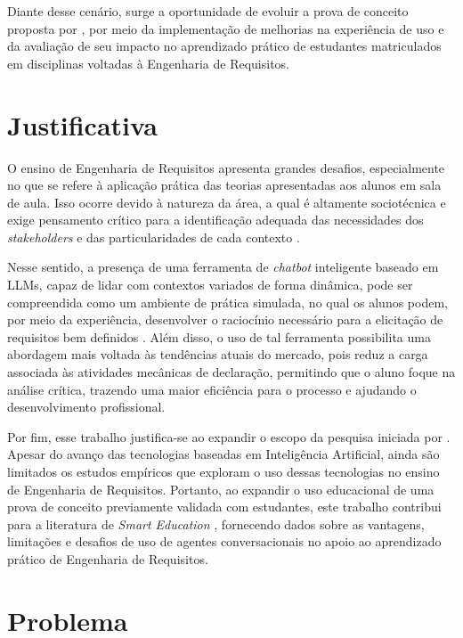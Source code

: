 Diante desse cenário, surge a oportunidade de evoluir a prova de conceito proposta por , por meio da implementação de melhorias na experiência de uso e da avaliação de seu impacto no aprendizado prático de estudantes matriculados em disciplinas voltadas à Engenharia de Requisitos.

\section{Justificativa}

O ensino de Engenharia de Requisitos apresenta grandes desafios, especialmente no que se refere à aplicação prática das teorias apresentadas aos alunos em sala de aula. Isso ocorre devido à natureza da área, a qual é altamente sociotécnica e exige pensamento crítico para a identificação adequada das necessidades dos \textit{stakeholders} e das particularidades de cada contexto \cite{sommerville2016}.

Nesse sentido, a presença de uma ferramenta de \textit{chatbot} inteligente baseado em LLMs, capaz de lidar com contextos variados de forma dinâmica, pode ser compreendida como um ambiente de prática simulada, no qual os alunos podem, por meio da experiência, desenvolver o raciocínio necessário para a elicitação de requisitos bem definidos \cite{urquiza2025, motger2021}. Além disso, o uso de tal ferramenta possibilita uma abordagem mais voltada às tendências atuais do mercado, pois reduz a carga associada às atividades mecânicas de declaração, permitindo que o aluno foque na análise crítica, trazendo uma maior eficiência para o processo e ajudando o desenvolvimento profissional.

Por fim, esse trabalho justifica-se ao expandir o escopo da pesquisa iniciada por . Apesar do avanço das tecnologias baseadas em Inteligência Artificial, ainda são limitados os estudos empíricos que exploram o uso dessas tecnologias no ensino de Engenharia de Requisitos. Portanto, ao expandir o uso educacional de uma prova de conceito previamente validada com estudantes, este trabalho contribui para a literatura de \textit{Smart Education} \cite{zhu2016, almogren2024}, fornecendo dados sobre as vantagens, limitações e desafios de uso de agentes conversacionais no apoio ao aprendizado prático de Engenharia de Requisitos.

\section{Problema}

